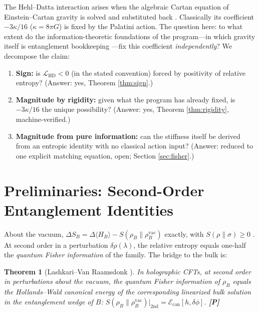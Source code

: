 \documentclass[11pt]{article}
\newtheorem{theorem}{Theorem}[section]
\theoremstyle{definition}
\newcommand{\pP}{\textbf{[P]}}
\begin{document}
The Hehl--Datta interaction \cite{HehlDatta1971} arises when the
algebraic Cartan equation of Einstein--Cartan gravity is solved and
substituted back \cite{HehlRMP1976,McGwier2026c}. Classically its
coefficient $-3\kappa/16$ ($\kappa=8\pi G$) is fixed by the Palatini
action. The question here: to what extent do the information-theoretic
foundations of the program---in which gravity itself is entanglement
bookkeeping \cite{Faulkner2014,McGwier2026a}---fix this coefficient
\emph{independently}? We decompose the claim:

\begin{enumerate}[itemsep=1pt]
\item \textbf{Sign:} is $\mathcal L_{\mathrm{HD}}<0$ (in the stated
convention) forced by positivity of relative entropy? (Answer: yes,
Theorem \ref{thm:sign}.)
\item \textbf{Magnitude by rigidity:} given what the program has already
fixed, is $-3\kappa/16$ the unique possibility? (Answer: yes, Theorem
\ref{thm:rigidity}, machine-verified.)
\item \textbf{Magnitude from pure information:} can the stiffness itself
be derived from an entropic identity with no classical action input?
(Answer: reduced to one explicit matching equation, open;
Section \ref{sec:fisher}.)
\end{enumerate}

\section{Preliminaries: Second-Order Entanglement Identities}

About the vacuum, $\Delta S_B=\Delta\langle H_B\rangle
-S(\rho_B\|\rho_B^{\mathrm{vac}})$ exactly, with
$S(\rho\|\sigma)\ge0$ \cite{Casini2008,BlancoCasini2013}. At second order
in a perturbation $\delta\rho(\lambda)$, the relative entropy equals
one-half the \emph{quantum Fisher information} of the family. The bridge
to the bulk is:

\begin{theorem}[Lashkari--Van Raamsdonk \cite{LVR2016}]
In holographic CFTs, at second order in perturbations about the vacuum,
the quantum Fisher information of $\rho_B$ equals the Hollands--Wald
canonical energy \cite{HollandsWald2013} of the corresponding linearized
bulk solution in the entanglement wedge of $B$:
$S(\rho_B\|\rho_B^{\mathrm{vac}})\big|_{2\mathrm{nd}}
=\mathcal E_{\mathrm{can}}[h,\delta\phi]$. \pP{}
\end{theorem}
\end{document}
